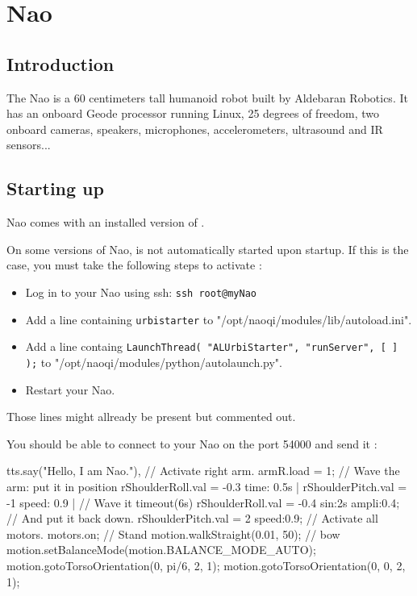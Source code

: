 \newcommand{\naoqi}{NaoQi\xspace}

\chapter{Nao}

\section{Introduction}

The Nao is a 60 centimeters tall humanoid robot built by Aldebaran Robotics.
It has an onboard Geode processor running Linux, 25 degrees of freedom,
two onboard cameras, speakers, microphones, accelerometers, ultrasound and IR
sensors...

\section{Starting up}

Nao comes with an installed version of \urbi.

On some versions of Nao, \urbi is not automatically started upon startup.
If this is the case, you must take the following steps to activate \urbi:

\begin{itemize}
\item Log in to your Nao using ssh: \lstinline|ssh root@myNao|
\item Add a line containing \lstinline|urbistarter| to
"/opt/naoqi/modules/lib/autoload.ini".
\item Add a line containg
\lstinline|LaunchThread( "ALUrbiStarter", "runServer", [ ] );| to "/opt/naoqi/modules/python/autolaunch.py".
\item Restart your Nao.
\end{itemize}

Those lines might allready be present but commented out.

You should be able to connect to your Nao on the port 54000 and send it \us:

\begin{urbifixme}
tts.say("Hello, I am Nao."),
// Activate right arm.
armR.load = 1;
// Wave the arm: put it in position
rShoulderRoll.val = -0.3 time: 0.5s |
rShoulderPitch.val = -1 speed: 0.9 |
// Wave it
timeout(6s) rShoulderRoll.val = -0.4 sin:2s ampli:0.4;
// And put it back down.
rShoulderPitch.val = 2 speed:0.9;
// Activate all motors.
motors.on;
// Stand
motion.walkStraight(0.01, 50);
// bow
motion.setBalanceMode(motion.BALANCE_MODE_AUTO);
motion.gotoTorsoOrientation(0, pi/6, 2, 1);
motion.gotoTorsoOrientation(0, 0, 2, 1);
\end{urbifixme}

